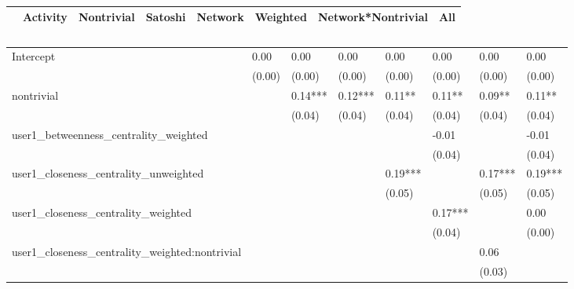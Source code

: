 \begin{table}
\caption{}
\begin{center}
\begin{tabular}{lccccccc}
\hline
                                               & Activity & Nontrivial & Satoshi & Network & Weighted & Network*Nontrivial &   All    \\
\hline
\hline
\end{tabular}
\begin{tabular}{llllllll}
Intercept                                      & 0.00     & 0.00       & 0.00    & 0.00    & 0.00     & 0.00               & 0.00     \\
                                               & (0.00)   & (0.00)     & (0.00)  & (0.00)  & (0.00)   & (0.00)             & (0.00)   \\
nontrivial                                     &          & 0.14***    & 0.12*** & 0.11**  & 0.11**   & 0.09**             & 0.11**   \\
                                               &          & (0.04)     & (0.04)  & (0.04)  & (0.04)   & (0.04)             & (0.04)   \\
user1_betweenness_centrality_weighted          &          &            &         &         & -0.01    &                    & -0.01    \\
                                               &          &            &         &         & (0.04)   &                    & (0.04)   \\
user1_closeness_centrality_unweighted          &          &            &         & 0.19*** &          & 0.17***            & 0.19***  \\
                                               &          &            &         & (0.05)  &          & (0.05)             & (0.05)   \\
user1_closeness_centrality_weighted            &          &            &         &         & 0.17***  &                    & 0.00     \\
                                               &          &            &         &         & (0.04)   &                    & (0.00)   \\
user1_closeness_centrality_weighted:nontrivial &          &            &         &         &          & 0.06               &          \\
                                               &          &            &         &         &          & (0.03)             &          \\

\end{tabular}
\end{center}
\end{table}
